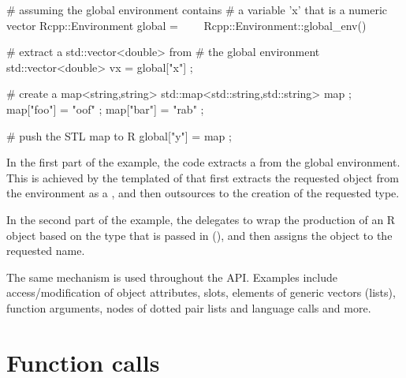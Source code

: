 \begin{example}
# assuming the global environment contains 
# a variable 'x' that is a numeric vector
Rcpp::Environment global = 
\ \ \ \ Rcpp::Environment::global_env()

# extract a std::vector<double> from 
# the global environment
std::vector<double> vx = global["x"] ;

# create a map<string,string>
std::map<std::string,std::string> map ;
map["foo"] = "oof" ;
map["bar"] = "rab" ;

# push the STL map to R
global["y"] = map ;
\end{example}

In the first part of the example, the code extracts a 
 from the global environment. This is 
achieved by the templated  of 
that first extracts the requested object from the environment as a , 
and then outsources to  the creation of the 
requested type. 

In the second part of the example, the  
delegates to wrap the production of an R object based on the 
type that is passed in (), 
and then assigns the object to the requested name.

The same mechanism is used throughout the API. Examples include access/modification
of object attributes, slots, elements of generic vectors (lists), 
function arguments, nodes of dotted pair lists and language calls and more. 

\section{Function calls}

